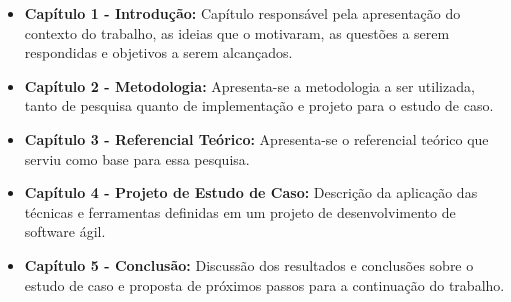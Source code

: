 \begin{itemize}
    \item \textbf{Capítulo 1 - Introdução:} Capítulo responsável  pela apresentação do contexto do trabalho, as ideias que o motivaram, as questões a serem respondidas e objetivos a serem alcançados.
    \item \textbf{Capítulo 2 - Metodologia:} Apresenta-se a metodologia a ser utilizada, tanto de pesquisa quanto de implementação e projeto para o estudo de caso.
    \item \textbf{Capítulo 3 - Referencial Teórico:} Apresenta-se o referencial teórico que serviu como base para essa pesquisa.
    \item \textbf{Capítulo 4 - Projeto de Estudo de Caso:} Descrição da aplicação das técnicas e ferramentas definidas em um projeto de desenvolvimento de software ágil.
    \item \textbf{Capítulo 5 - Conclusão:} Discussão dos resultados e conclusões sobre o estudo de caso e proposta de próximos passos para a continuação do trabalho.
\end{itemize}
